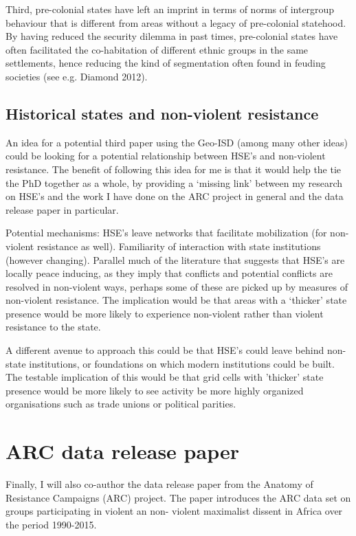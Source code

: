 \documentclass[12pt]{article}
\begin{document}
Third, pre-colonial states have left an imprint in terms of norms of intergroup
behaviour that is different from areas without a legacy of pre-colonial
statehood. By having reduced the security dilemma in past times, pre-colonial
states have often facilitated the co-habitation of different ethnic groups in
the same settlements, hence reducing the kind of segmentation often found in
feuding societies (see e.g. Diamond 2012).

\subsection{Historical states and non-violent resistance}

An idea for a potential third paper using the Geo-ISD (among many other ideas)
could be looking for a potential relationship between HSE's and non-violent
resistance. The benefit of following this idea for me is that it would help the
tie the PhD together as a whole, by providing a `missing link' between my
research on HSE's and the work I have done on the ARC project in general and the
data release paper in particular.

Potential mechanisms: HSE's leave networks that facilitate mobilization (for
non-violent resistance as well). Familiarity of interaction with state
institutions (however changing). Parallel much of the literature that suggests
that HSE's are locally peace inducing, as they imply that conflicts and
potential conflicts are resolved in non-violent ways, perhaps some of these are
picked up by measures of non-violent resistance. The implication would be that
areas with a `thicker' state presence would be more likely to experience
non-violent rather than violent resistance to the state.

A different avenue to approach this could be that HSE's could leave behind
non-state institutions, or foundations on which modern institutions could be
built. The testable implication of this would be that grid cells with 'thicker'
state presence would be more likely to see activity be more highly organized
organisations such as trade unions or political parities.

\section{ARC data release paper}

Finally, I will also co-author the data release paper from the Anatomy of 
Resistance Campaigns (ARC) project.
The paper introduces the ARC data set on groups participating in violent an non-
violent maximalist dissent in Africa over the period 1990-2015.
\end{document}
